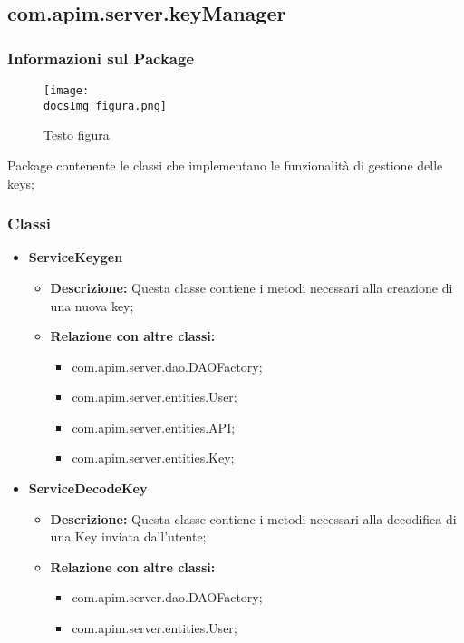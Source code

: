 {{    \subsection{com.apim.server.keyManager}{
    \subsubsection{Informazioni sul Package}
        \begin{figure}[ht]
          \centering
          \texttt{[image: \\docsImg figura.png]}
          \caption{Testo figura}
          \label{Testo figura}
        \end{figure}
        Package contenente le classi che implementano le funzionalità di gestione delle keys;
        \subsubsection{Classi}
        \begin{itemize} \itemsep1pt
          \item \textbf{ServiceKeygen}
          \begin{itemize}
            \item \textbf{Descrizione:} Questa classe contiene i metodi necessari alla creazione di una nuova key;
            \item \textbf{Relazione con altre classi:}
            \begin{itemize}
            \item com.apim.server.dao.DAOFactory;
            \item com.apim.server.entities.User;
            \item com.apim.server.entities.API;
            \item com.apim.server.entities.Key;
            \end{itemize}
          \end{itemize}
          \item \textbf{ServiceDecodeKey}
          \begin{itemize}
            \item \textbf{Descrizione:} Questa classe contiene i metodi necessari alla decodifica di una Key inviata dall'utente;
            \item \textbf{Relazione con altre classi:}
            \begin{itemize}
            \item com.apim.server.dao.DAOFactory;
            \item com.apim.server.entities.User;

\end{itemize}
\end{itemize}
\end{itemize}}}}
